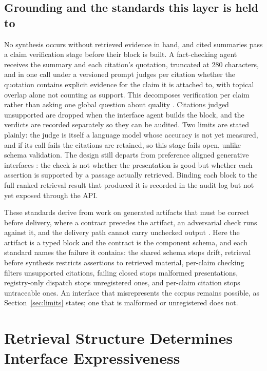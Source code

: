 \documentclass[conference]{IEEEtran}
\begin{document}
\subsection{Grounding and the standards this layer is held to}
No synthesis occurs without retrieved evidence in hand, and cited summaries pass a claim verification stage before their block is built. A fact-checking agent receives the summary and each citation's quotation, truncated at 280 characters, and in one call under a versioned prompt judges per citation whether the quotation contains explicit evidence for the claim it is attached to, with topical overlap alone not counting as support. This decomposes verification per claim rather than asking one global question about quality \cite{ref:kwok}. Citations judged unsupported are dropped when the interface agent builds the block, and the verdicts are recorded separately so they can be audited. Two limits are stated plainly: the judge is itself a language model whose accuracy is not yet measured, and if its call fails the citations are retained, so this stage fails open, unlike schema validation. The design still departs from preference aligned generative interfaces \cite{ref:alignui}: the check is not whether the presentation is good but whether each assertion is supported by a passage actually retrieved. Binding each block to the full ranked retrieval result that produced it is recorded in the audit log but not yet exposed through the API.

These standards derive from work on generated artifacts that must be correct before delivery, where a contract precedes the artifact, an adversarial check runs against it, and the delivery path cannot carry unchecked output \cite{ref:probe,ref:advermcts,ref:kwok}. Here the artifact is a typed block and the contract is the component schema, and each standard names the failure it contains: the shared schema stops drift, retrieval before synthesis restricts assertions to retrieved material, per-claim checking filters unsupported citations, failing closed stops malformed presentations, registry-only dispatch stops unregistered ones, and per-claim citation stops untraceable ones. An interface that misrepresents the corpus remains possible, as Section~\ref{sec:limits} states; one that is malformed or unregistered does not.
\section{Retrieval Structure Determines Interface Expressiveness}
\label{sec:bound}
\end{document}
